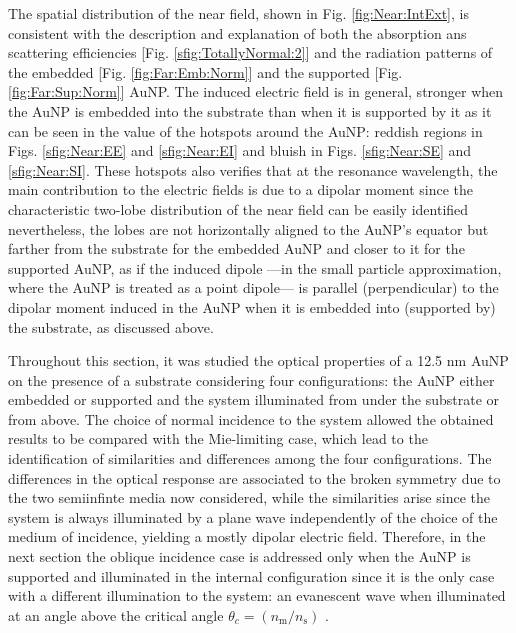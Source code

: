 The spatial distribution of the near field, shown in Fig. \ref{fig:Near:IntExt}, is consistent with the description and explanation of both the absorption ans scattering efficiencies [Fig. \ref{sfig:TotallyNormal:2}] and the radiation patterns of the embedded [Fig. \ref{fig:Far:Emb:Norm}] and the supported [Fig. \ref{fig:Far:Sup:Norm}] AuNP. The induced electric field is in general, stronger when the AuNP is embedded into the substrate than when it is supported by it as it can be seen in the value of the hotspots around the AuNP: reddish regions in Figs. \ref{sfig:Near:EE} and \ref{sfig:Near:EI} and bluish in Figs. \ref{sfig:Near:SE} and \ref{sfig:Near:SI}. These hotspots also verifies that at the resonance wavelength, the main contribution to the electric fields is due to a dipolar moment since the characteristic two-lobe distribution of the near field can be easily identified nevertheless, the lobes are not horizontally aligned to the AuNP's equator but farther from the substrate for the embedded AuNP and closer to it for the supported AuNP, as if the induced dipole ---in the small particle approximation, where the AuNP is treated as a point dipole--- is parallel (perpendicular) to the dipolar moment induced in the AuNP when it is embedded into (supported by) the substrate, as discussed above.

Throughout this section, it was studied the optical properties of a 12.5 nm AuNP on the presence of a substrate considering four configurations: the AuNP either embedded or supported and the system illuminated from under the substrate or from above. The choice of normal incidence to the system allowed the obtained results to be compared with the Mie-limiting case, which lead to the identification of similarities and differences among the four configurations. The differences in the optical response are associated to the broken symmetry due to the two semiinfinte media now considered, while the similarities arise since the system is always illuminated by a plane wave independently of the choice of the medium of incidence, yielding a mostly dipolar electric field. Therefore, in the next section the oblique incidence case is addressed only when the AuNP is supported and illuminated in the internal configuration since it is the only case with a different illumination to the system: an evanescent wave when illuminated at an angle above the critical angle $\theta_c = (n_\text{m}/n_\text{s})$ \cite{born_max_principle_1999}.
